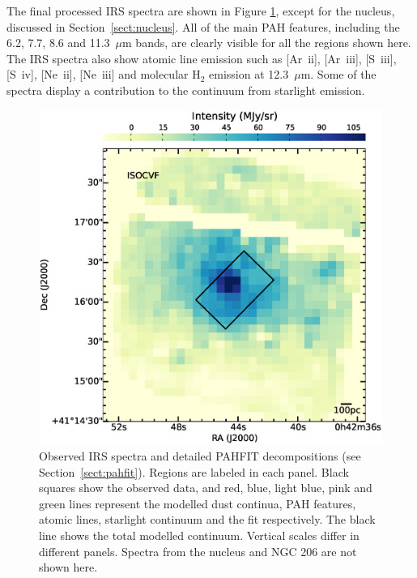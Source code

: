 
The final processed IRS spectra are shown in  Figure \ref{PAHFITplots}, except for the nucleus, discussed in Section~\ref{sect:nucleus}.
All of the main PAH features, including the 6.2, 7.7, 8.6 and 11.3~$\mu$m bands, 
are clearly visible for all the regions shown here.
The IRS spectra also show atomic line emission such as [Ar~{\sc ii}], [Ar~{\sc iii}], [S~{\sc iii}], [S~{\sc iv}], [Ne~{\sc ii}], [Ne~{\sc iii}] 
and molecular H$_{2}$ emission at 12.3~$\mu$m. Some of the spectra display a contribution to the continuum from starlight emission.


\begin{figure}
\centering
\includegraphics[scale=0.45]{./fig5.eps}
 \caption{Observed IRS spectra and detailed PAHFIT decompositions (see Section~\ref{sect:pahfit}). Regions are labeled in each panel.
Black squares show the observed data, and red, blue, light blue, pink and green lines represent the modelled
dust continua, PAH features, atomic lines, starlight continuum and the fit respectively. The black line shows the total modelled continuum. 
Vertical scales differ in different panels. Spectra from the nucleus and NGC 206 are not shown here.
}
\label{PAHFITplots}
\end{figure}


